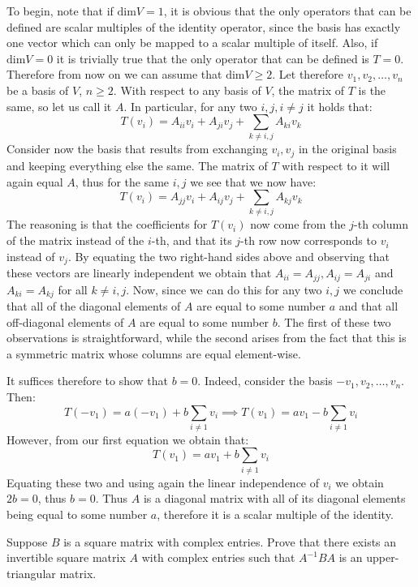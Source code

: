 \begin{solution}

    To begin, note that if $\text{dim} V = 1$, it is obvious that the only operators that can be defined are scalar multiples of the identity operator, since the basis has exactly one vector which can only be mapped to a scalar multiple of itself. Also, if $\text{dim} V = 0$ it is trivially true that the only operator that can be defined is $T = 0$. Therefore from now on we can assume that $\text{dim} V \geq 2$. Let therefore $v_1, v_2, \ldots, v_n$ be a basis of $V$, $n \geq 2$. With respect to any basis of $V$, the matrix of $T$ is the same, so let us call it $A$. In particular, for any two $i, j, i \neq j$ it holds that:
    $$T(v_i) = A_{ii}v_i + A_{ji}v_j + \sum_{k \neq i, j} A_{ki}v_k$$
    Consider now the basis that results from exchanging $v_i, v_j$ in the original basis and keeping everything else the same. The matrix of $T$ with respect to it will again equal $A$, thus for the same $i, j$ we see that we now have:
    $$T(v_i) = A_{jj}v_i + A_{ij}v_j + \sum_{k \neq i, j} A_{kj}v_k$$
    The reasoning is that the coefficients for $T(v_i)$ now come from the $j$-th column of the matrix instead of the $i$-th, and that its $j$-th row now corresponds to $v_i$ instead of $v_j$. By equating the two right-hand sides above and observing that these vectors are linearly independent we obtain that $A_{ii} = A_{jj}, A_{ij} = A_{ji}$ and $ A_{ki} = A_{kj}$ for all $k \neq i, j$. Now, since we can do this for any two $i, j$ we conclude that all of the diagonal elements of $A$ are equal to some number $a$ and that all off-diagonal elements of $A$ are equal to some number $b$. The first of these two observations is straightforward, while the second arises from the fact that this is a symmetric matrix whose columns are equal element-wise.

    It suffices therefore to show that $b = 0$. Indeed, consider the basis $-v_1, v_2, \ldots, v_n$. Then:
    $$T(-v_1) = a(-v_1) + b\sum_{i \neq 1}v_i \implies T(v_1) = av_1 - b \sum_{i \neq 1} v_i$$
    However, from our first equation we obtain that:
    $$T(v_1) = av_1 + b\sum_{i \neq 1}v_i$$
    Equating these two and using again the linear independence of $v_i$ we obtain $2b = 0$, thus $b=0$. Thus $A$ is a diagonal matrix with all of its diagonal elements being equal to some number $a$, therefore it is a scalar multiple of the identity.
\end{solution}

\begin{exercise}{5}
    Suppose $B$ is a square matrix with complex entries. Prove that there exists an invertible square matrix $A$ with complex entries such that $A^{-1}BA$ is an upper-triangular matrix.
\end{exercise}

